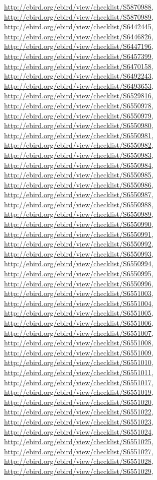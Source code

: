 \documentclass[9pt, article]{memoir}
\begin{document}
\begin{multicols}{2}
\url{http://ebird.org/ebird/view/checklist/S5870988}, 
\url{http://ebird.org/ebird/view/checklist/S5870989}, 
\url{http://ebird.org/ebird/view/checklist/S6442445}, 
\url{http://ebird.org/ebird/view/checklist/S6446826}, 
\url{http://ebird.org/ebird/view/checklist/S6447196}, 
\url{http://ebird.org/ebird/view/checklist/S6457399}, 
\url{http://ebird.org/ebird/view/checklist/S6470158}, 
\url{http://ebird.org/ebird/view/checklist/S6492243}, 
\url{http://ebird.org/ebird/view/checklist/S6493653}, 
\url{http://ebird.org/ebird/view/checklist/S6529816}, 
\url{http://ebird.org/ebird/view/checklist/S6550978}, 
\url{http://ebird.org/ebird/view/checklist/S6550979}, 
\url{http://ebird.org/ebird/view/checklist/S6550980}, 
\url{http://ebird.org/ebird/view/checklist/S6550981}, 
\url{http://ebird.org/ebird/view/checklist/S6550982}, 
\url{http://ebird.org/ebird/view/checklist/S6550983}, 
\url{http://ebird.org/ebird/view/checklist/S6550984}, 
\url{http://ebird.org/ebird/view/checklist/S6550985}, 
\url{http://ebird.org/ebird/view/checklist/S6550986}, 
\url{http://ebird.org/ebird/view/checklist/S6550987}, 
\url{http://ebird.org/ebird/view/checklist/S6550988}, 
\url{http://ebird.org/ebird/view/checklist/S6550989}, 
\url{http://ebird.org/ebird/view/checklist/S6550990}, 
\url{http://ebird.org/ebird/view/checklist/S6550991}, 
\url{http://ebird.org/ebird/view/checklist/S6550992}, 
\url{http://ebird.org/ebird/view/checklist/S6550993}, 
\url{http://ebird.org/ebird/view/checklist/S6550994}, 
\url{http://ebird.org/ebird/view/checklist/S6550995}, 
\url{http://ebird.org/ebird/view/checklist/S6550996}, 
\url{http://ebird.org/ebird/view/checklist/S6551003}, 
\url{http://ebird.org/ebird/view/checklist/S6551004}, 
\url{http://ebird.org/ebird/view/checklist/S6551005}, 
\url{http://ebird.org/ebird/view/checklist/S6551006}, 
\url{http://ebird.org/ebird/view/checklist/S6551007}, 
\url{http://ebird.org/ebird/view/checklist/S6551008}, 
\url{http://ebird.org/ebird/view/checklist/S6551009}, 
\url{http://ebird.org/ebird/view/checklist/S6551010}, 
\url{http://ebird.org/ebird/view/checklist/S6551011}, 
\url{http://ebird.org/ebird/view/checklist/S6551017}, 
\url{http://ebird.org/ebird/view/checklist/S6551019}, 
\url{http://ebird.org/ebird/view/checklist/S6551020}, 
\url{http://ebird.org/ebird/view/checklist/S6551022}, 
\url{http://ebird.org/ebird/view/checklist/S6551023}, 
\url{http://ebird.org/ebird/view/checklist/S6551024}, 
\url{http://ebird.org/ebird/view/checklist/S6551025}, 
\url{http://ebird.org/ebird/view/checklist/S6551027}, 
\url{http://ebird.org/ebird/view/checklist/S6551028}, 
\url{http://ebird.org/ebird/view/checklist/S6551029}, 

\end{multicols}
\end{document}
